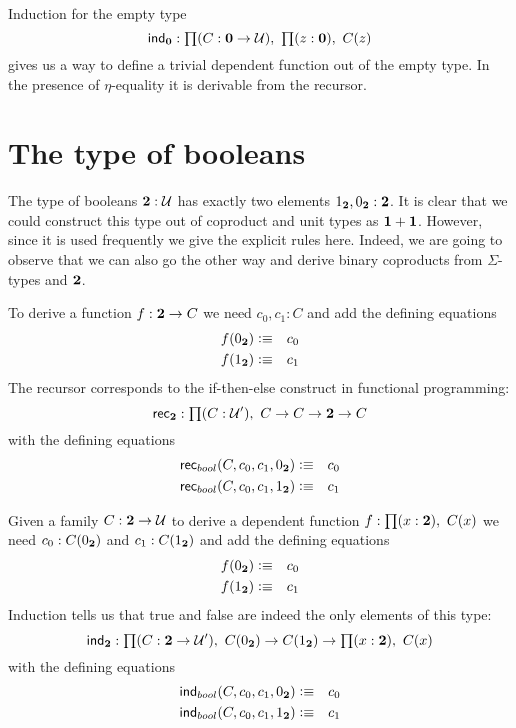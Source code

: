 Induction for the empty type
\[ \ind{\emptyt} : \prd{C:\emptyt \to \UU}\prd{z:\emptyt} C(z) \]
gives us a way to define a trivial dependent function out of the
empty type. In the presence of $\eta$-equality it is derivable
from the recursor.

\section{The type of booleans}
\label{sec:type-booleans}

The type of booleans $\mathbf{2}:\mathcal{U}$ has exactly two elements 
$1_{\mathbf{2}},0_{\mathbf{2}} : \mathbf{2}$. It is clear that we could construct this
type out of coproduct and unit types as $\mathbf{1} + \mathbf{1}$. However,
since it is used frequently we give the explicit rules here.
Indeed, we are going to observe that we can also go the other way
and derive binary coproducts from $\Sigma$-types and $\mathbf{2}$.

To derive a function $f : \mathbf{2} \to C$ we need $c_0,c_1 : C$ and
add the defining equations
\begin{eqnarray*}
  f(0_{\mathbf{2}}) & \vcentcolon\equiv & c_0 \\
  f(1_{\mathbf{2}}) & \vcentcolon\equiv & c_1
\end{eqnarray*}
The recursor corresponds to the if-then-else construct in
functional programming:
\[ \rec{\bool} : \prd{C:\UU'}  C \to C \to \bool \to C \]
with the defining equations
\begin{eqnarray*}
  \mathsf{rec}_{bool}(C,c_0,c_1,0_{\mathbf{2}}) & \vcentcolon\equiv & c_0 \\
  \mathsf{rec}_{bool}(C,c_0,c_1,1_{\mathbf{2}}) & \vcentcolon\equiv & c_1
\end{eqnarray*}

Given a family $C : \mathbf{2} \to \mathcal{U}$ to derive a dependent function 
$f : \prd{x:\bool}C(x)$ we need $c_0:C(0_{\mathbf{2}})$ and $c_1 : C(1_{\mathbf{2}})$ and
add the defining equations
\begin{eqnarray*}
  f(0_{\mathbf{2}}) & \vcentcolon\equiv & c_0 \\
  f(1_{\mathbf{2}}) & \vcentcolon\equiv & c_1
\end{eqnarray*}
Induction tells us that true and false are indeed the only
elements of this type:
\[ \ind{\bool} : \prd{C:\bool \to \UU'}  C(\bfalse) \to C(\btrue)
\to \prd{x:\bool} C(x) \]
with the defining equations
\begin{eqnarray*}
  \mathsf{ind}_{bool}(C,c_0,c_1,0_{\mathbf{2}}) & \vcentcolon\equiv & c_0 \\
  \mathsf{ind}_{bool}(C,c_0,c_1,1_{\mathbf{2}}) & \vcentcolon\equiv & c_1
\end{eqnarray*}

